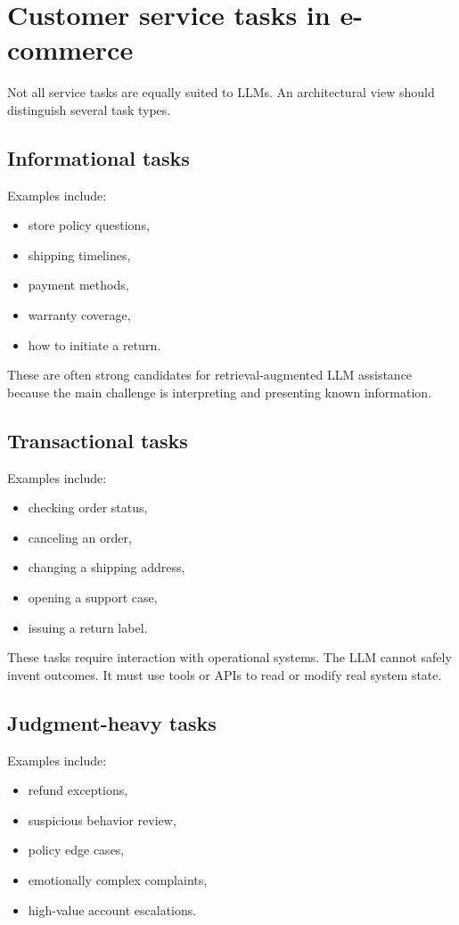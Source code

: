 \section{Customer service tasks in e-commerce}
Not all service tasks are equally suited to LLMs.
An architectural view should distinguish several task types.

\subsection{Informational tasks}
Examples include:
\begin{itemize}
  \item store policy questions,
  \item shipping timelines,
  \item payment methods,
  \item warranty coverage,
  \item how to initiate a return.
\end{itemize}

These are often strong candidates for retrieval-augmented LLM assistance because the main challenge is interpreting and presenting known information.

\subsection{Transactional tasks}
Examples include:
\begin{itemize}
  \item checking order status,
  \item canceling an order,
  \item changing a shipping address,
  \item opening a support case,
  \item issuing a return label.
\end{itemize}

These tasks require interaction with operational systems.
The LLM cannot safely invent outcomes.
It must use tools or APIs to read or modify real system state.

\subsection{Judgment-heavy tasks}
Examples include:
\begin{itemize}
  \item refund exceptions,
  \item suspicious behavior review,
  \item policy edge cases,
  \item emotionally complex complaints,
  \item high-value account escalations.
\end{itemize}

